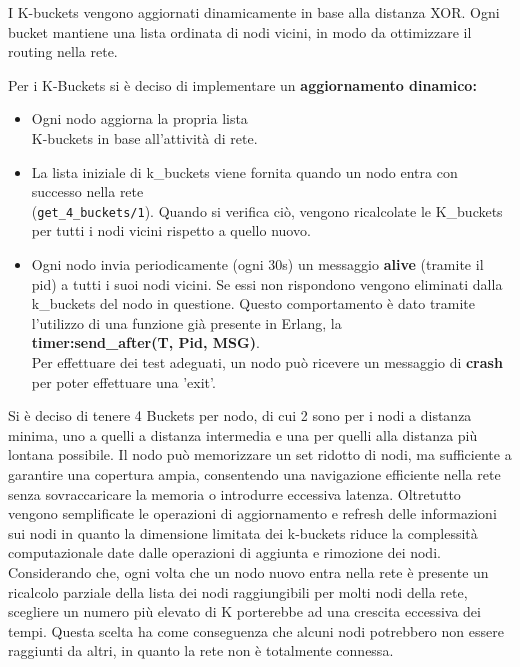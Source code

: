 \documentclass{article}
\begin{document}
I K-buckets vengono aggiornati dinamicamente in base alla distanza XOR. Ogni bucket mantiene una lista ordinata di nodi vicini, in modo da ottimizzare il routing nella rete.


Per i K-Buckets si è deciso di implementare un \textbf{aggiornamento dinamico:}
    \begin{itemize}
        \item Ogni nodo aggiorna la propria lista\\ K-buckets in base all'attività di rete.
        \item La lista iniziale di k\_buckets viene fornita quando un nodo entra con successo nella rete\\ (\texttt{get\_4\_buckets/1}). Quando si verifica ciò, vengono ricalcolate le K\_buckets per tutti i nodi vicini rispetto a quello nuovo.
        \item Ogni nodo invia periodicamente (ogni 30s) un messaggio \textbf{alive} (tramite il pid) a tutti i suoi nodi vicini. Se essi non rispondono vengono eliminati dalla k\_buckets del nodo in questione. Questo comportamento è dato tramite l'utilizzo di una funzione già presente in Erlang, la\\ \textbf{timer:send\_after(T, Pid, MSG)}.\\
        Per effettuare dei test adeguati, un nodo può ricevere un messaggio di \textbf{crash} per poter effettuare una 'exit'.
    \end{itemize}

Si è deciso di tenere 4 Buckets per nodo, di cui 2 sono per i nodi a distanza minima, uno a quelli a distanza intermedia e una per quelli alla distanza più lontana possibile. Il nodo può memorizzare un set ridotto di nodi, ma sufficiente a garantire una copertura ampia, consentendo una navigazione efficiente nella rete senza sovraccaricare la memoria o introdurre eccessiva latenza. Oltretutto vengono semplificate le operazioni di aggiornamento e refresh delle informazioni sui nodi in quanto la dimensione limitata dei k-buckets riduce la complessità computazionale date dalle operazioni di aggiunta e rimozione dei nodi. \\
Considerando che, ogni volta che un nodo nuovo entra nella rete è presente un ricalcolo parziale della lista dei nodi raggiungibili per molti nodi della rete, scegliere un numero più elevato di K porterebbe ad una crescita eccessiva dei tempi. Questa scelta ha come conseguenza che alcuni nodi potrebbero non essere raggiunti da altri, in quanto la rete non è totalmente connessa.
\end{document}
